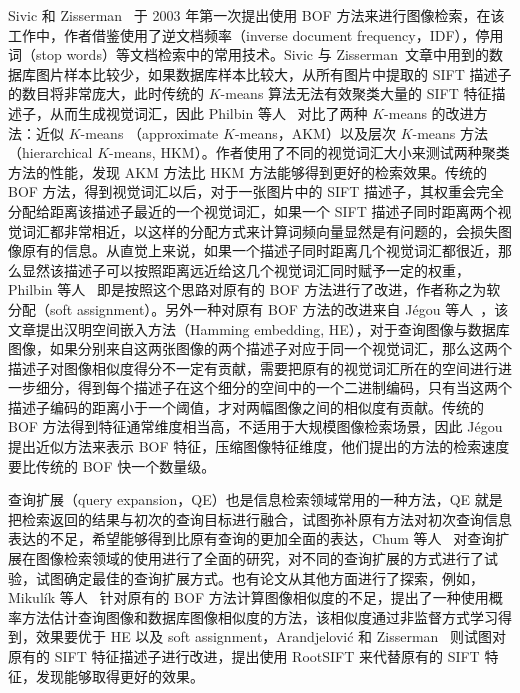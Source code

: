 Sivic 和 Zisserman~\cite{Sivic2003VideoGA} 于 2003 年第一次提出使用 BOF 方法来进行图像检索，在该工作中，作者借鉴使用了逆文档频率（inverse document frequency，IDF），停用词（stop words）等文档检索中的常用技术。Sivic 与 Zisserman~\cite{Sivic2003VideoGA}文章中用到的数据库图片样本比较少，如果数据库样本比较大，从所有图片中提取的 SIFT 描述子的数目将非常庞大，此时传统的 $K$-means 算法无法有效聚类大量的 SIFT 特征描述子，从而生成视觉词汇，因此 Philbin 等人~\cite{Philbin2007ObjectRW} 对比了两种 $K$-means 的改进方法：近似 $K$-means （approximate $K$-means，AKM）以及层次 $K$-means 方法（hierarchical $K$-means, HKM）。作者使用了不同的视觉词汇大小来测试两种聚类方法的性能，发现 AKM 方法比 HKM 方法能够得到更好的检索效果。传统的 BOF 方法，得到视觉词汇以后，对于一张图片中的 SIFT 描述子，其权重会完全分配给距离该描述子最近的一个视觉词汇，如果一个 SIFT 描述子同时距离两个视觉词汇都非常相近，以这样的分配方式来计算词频向量显然是有问题的，会损失图像原有的信息。从直觉上来说，如果一个描述子同时距离几个视觉词汇都很近，那么显然该描述子可以按照距离远近给这几个视觉词汇同时赋予一定的权重，Philbin 等人~\cite{Philbin2008LostIQ} 即是按照这个思路对原有的 BOF 方法进行了改进，作者称之为软分配（soft assignment）。另外一种对原有 BOF 方法的改进来自 J{\'e}gou 等人~\cite{Jgou2008HammingEA}，该文章提出汉明空间嵌入方法（Hamming embedding, HE），对于查询图像与数据库图像，如果分别来自这两张图像的两个描述子对应于同一个视觉词汇，那么这两个描述子对图像相似度得分不一定有贡献，需要把原有的视觉词汇所在的空间进行进一步细分，得到每个描述子在这个细分的空间中的一个二进制编码，只有当这两个描述子编码的距离小于一个阈值，才对两幅图像之间的相似度有贡献。传统的 BOF 方法得到特征通常维度相当高，不适用于大规模图像检索场景，因此 J{\'e}gou~\cite{Jgou2009PackingB} 提出近似方法来表示 BOF 特征，压缩图像特征维度，他们提出的方法的检索速度要比传统的 BOF 快一个数量级。

查询扩展（query expansion，QE）也是信息检索领域常用的一种方法，QE 就是把检索返回的结果与初次的查询目标进行融合，试图弥补原有方法对初次查询信息表达的不足，希望能够得到比原有查询的更加全面的表达，Chum 等人~\cite{Chum2007TotalRA} 对查询扩展在图像检索领域的使用进行了全面的研究，对不同的查询扩展的方式进行了试验，试图确定最佳的查询扩展方式。也有论文从其他方面进行了探索，例如，Mikulík 等人~\cite{Mikulk2010LearningAF} 针对原有的 BOF 方法计算图像相似度的不足，提出了一种使用概率方法估计查询图像和数据库图像相似度的方法，该相似度通过非监督方式学习得到，效果要优于 HE 以及 soft assignment，Arandjelovi{\'c} 和 Zisserman~\cite{Arandjelovic2012ThreeTE} 则试图对原有的 SIFT 特征描述子进行改进，提出使用 RootSIFT 来代替原有的 SIFT 特征，发现能够取得更好的效果。

